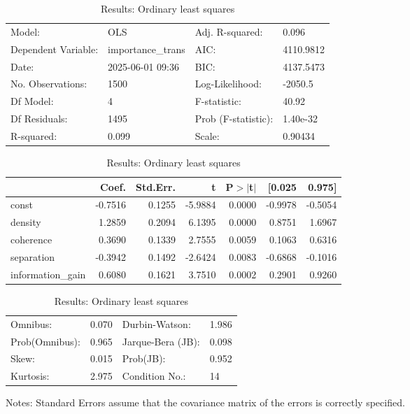\begin{table}
\caption{Results: Ordinary least squares}
\label{}
\begin{center}
\begin{tabular}{llll}
\hline
Model:              & OLS               & Adj. R-squared:     & 0.096      \\
Dependent Variable: & importance\_trans & AIC:                & 4110.9812  \\
Date:               & 2025-06-01 09:36  & BIC:                & 4137.5473  \\
No. Observations:   & 1500              & Log-Likelihood:     & -2050.5    \\
Df Model:           & 4                 & F-statistic:        & 40.92      \\
Df Residuals:       & 1495              & Prob (F-statistic): & 1.40e-32   \\
R-squared:          & 0.099             & Scale:              & 0.90434    \\
\hline
\end{tabular}
\end{center}

\begin{center}
\begin{tabular}{lrrrrrr}
\hline
                  &   Coef. & Std.Err. &       t & P$> |$t$|$ &  [0.025 &  0.975]  \\
\hline
const             & -0.7516 &   0.1255 & -5.9884 &      0.0000 & -0.9978 & -0.5054  \\
density           &  1.2859 &   0.2094 &  6.1395 &      0.0000 &  0.8751 &  1.6967  \\
coherence         &  0.3690 &   0.1339 &  2.7555 &      0.0059 &  0.1063 &  0.6316  \\
separation        & -0.3942 &   0.1492 & -2.6424 &      0.0083 & -0.6868 & -0.1016  \\
information\_gain &  0.6080 &   0.1621 &  3.7510 &      0.0002 &  0.2901 &  0.9260  \\
\hline
\end{tabular}
\end{center}

\begin{center}
\begin{tabular}{llll}
\hline
Omnibus:       & 0.070 & Durbin-Watson:    & 1.986  \\
Prob(Omnibus): & 0.965 & Jarque-Bera (JB): & 0.098  \\
Skew:          & 0.015 & Prob(JB):         & 0.952  \\
Kurtosis:      & 2.975 & Condition No.:    & 14     \\
\hline
\end{tabular}
\end{center}
\end{table}
\bigskip
Notes: \newline 
[1] Standard Errors assume that the covariance matrix of the errors is correctly specified.